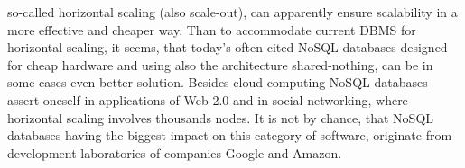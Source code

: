  so-called
horizontal scaling (also scale-out), can apparently ensure scalability in a more effective
and cheaper way. Than to accommodate current DBMS for horizontal scaling, it seems,
that today’s often cited NoSQL databases designed for cheap hardware and using also
the  architecture  shared-nothing,  can  be  in  some  cases  even  better  solution.  Besides
cloud computing NoSQL databases assert  oneself  in applications  of Web 2.0 and in
social  networking,  where  horizontal  scaling  involves  thousands  nodes.  It  is  not  by
chance, that NoSQL databases having the biggest impact on this category of software,
originate from development laboratories of companies Google and Amazon.





